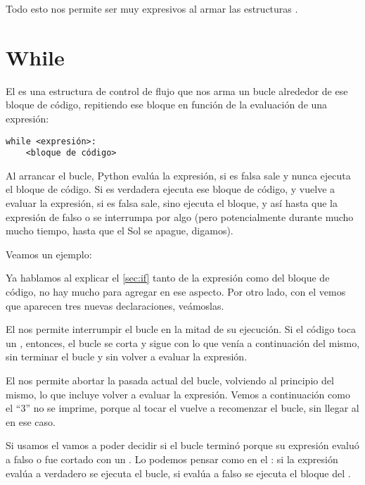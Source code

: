 Todo esto nos permite ser muy expresivos al armar las estructuras . 


\section{While}\label{sec:while}

El  es una estructura de control de flujo que nos arma un bucle alrededor de ese bloque de código, repitiendo ese bloque en función de la evaluación de una expresión:

\begin{verbatim}
while <expresión>:
    <bloque de código>
\end{verbatim}

Al arrancar el bucle, Python evalúa la expresión, si es falsa sale y nunca ejecuta el bloque de código. Si es verdadera ejecuta ese bloque de código, y vuelve a evaluar la expresión, si es falsa sale, sino ejecuta el bloque, y así hasta que la expresión de falso o se interrumpa por algo (pero potencialmente durante mucho mucho tiempo, hasta que el Sol se apague, digamos).

Veamos un ejemplo:


Ya hablamos al explicar el  \ref{sec:if} tanto de la expresión como del bloque de código, no hay mucho para agregar en ese aspecto. Por otro lado, con el  vemos que aparecen tres nuevas declaraciones, veámoslas.

El  nos permite interrumpir el bucle en la mitad de su ejecución. Si el código toca un , entonces, el bucle se corta y sigue con lo que venía a continuación del mismo, sin terminar el bucle y sin volver a evaluar la expresión.


El  nos permite abortar la pasada actual del bucle, volviendo al principio del mismo, lo que incluye volver a evaluar la expresión. Vemos a continuación como el ``3'' no se imprime, porque al tocar el  vuelve a recomenzar el bucle, sin llegar al  en ese caso.


Si usamos el  vamos a poder decidir si el bucle  terminó porque su expresión evaluó a falso o fue cortado con un . Lo podemos pensar como en el : si la expresión evalúa a verdadero se ejecuta el bucle, si evalúa a falso se ejecuta el bloque del .

